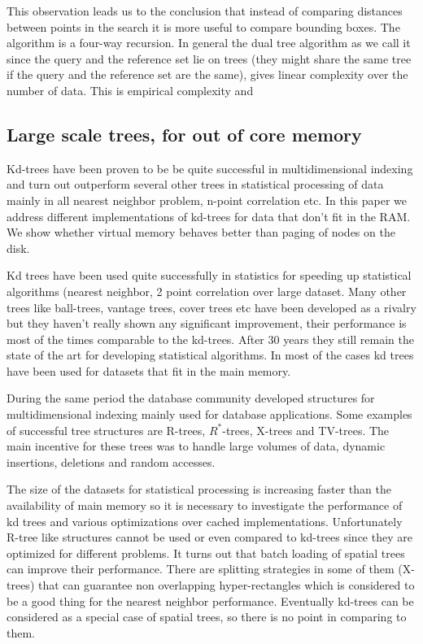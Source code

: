 \documentclass[12pt,letterpaper,doublespaced,ETD,dvips,proposal]{gtthesis}
\begin{document}
\begin{Body}
This observation leads us to the conclusion that instead of
comparing distances between points in the search it is more useful
to compare bounding boxes. The algorithm is  a four-way recursion.
In general the dual tree algorithm as we call it since the query and
the reference set lie on trees (they might share the same tree if
the query and the reference set are the same), gives linear
complexity over the number of data. This is empirical complexity and

\subsection{Large scale trees, for out of core memory}
Kd-trees have been proven to be be quite successful in
multidimensional indexing and turn out outperform several other
trees in statistical processing of data mainly in all nearest
neighbor problem, n-point correlation etc. In this paper we address
different implementations of kd-trees for data that don't fit in the
RAM. We show whether virtual memory behaves better   than paging of
nodes on the disk.

Kd trees have been used quite successfully in statistics for
speeding up statistical algorithms (nearest neighbor, 2 point
correlation  over large dataset. Many other trees like ball-trees,
vantage trees, cover trees etc have been developed as a rivalry but
they haven't really shown any significant improvement, their
performance is most of the times comparable to the kd-trees. After
30 years they still remain the state of the art for developing
statistical algorithms. In most of the cases kd trees have been used
for datasets that fit in the main memory.

During the same period the database community developed structures
for multidimensional indexing mainly used for database applications.
Some examples of successful tree structures are R-trees,
$R^{*}$-trees, X-trees and TV-trees. The main incentive for these
trees was to handle large volumes of data, dynamic insertions,
deletions and random accesses.

The size of the datasets for statistical processing is increasing
faster than the availability of  main memory so it is necessary to
investigate the performance of kd trees and various optimizations
over cached implementations. Unfortunately R-tree like structures
cannot be used or even compared to kd-trees since they are optimized
for different problems. It turns out that batch loading of spatial
trees can improve their performance. There are splitting strategies
in some of them (X-trees) that can guarantee non overlapping
hyper-rectangles which is considered to be a good thing for the
nearest neighbor performance. Eventually kd-trees can be considered
as a special case of spatial trees, so there is no point in
comparing to them.


\end{Body}
\end{document}
